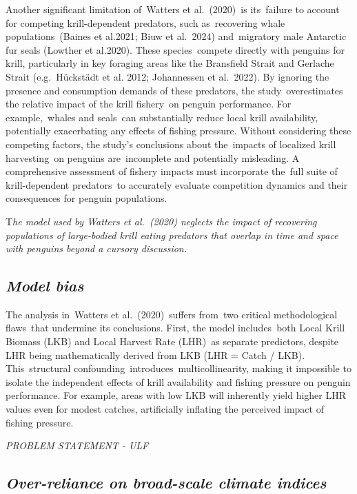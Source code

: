\documentclass[]{elsarticle} %
\begin{document}
Another significant limitation of~Watters et al.~(2020)~is its~failure
to account for competing krill-dependent predators, such as~recovering
whale populations~(Baines et al.2021; Biuw et al.~2024) and~migratory
male Antarctic fur seals (Lowther et al.2020). These species~compete
directly with penguins for krill, particularly in key foraging areas
like the Bransfield Strait and Gerlache Strait (e.g.~Hückstädt et al.
2012; Johannessen et al.~2022). By ignoring the presence and consumption
demands of these predators, the study~overestimates the relative impact
of the krill fishery~on penguin performance. For example,~whales and
seals~can substantially reduce local krill availability, potentially
exacerbating any effects of fishing pressure. Without considering these
competing factors, the study's conclusions about the~impacts of
localized krill harvesting~on penguins are~incomplete and potentially
misleading. A comprehensive assessment of fishery impacts must
incorporate the~full suite of krill-dependent predators~to accurately
evaluate competition dynamics and their consequences for penguin
populations.

T\emph{he model used by Watters et al.~(2020) neglects the impact of
recovering populations of large-bodied krill eating predators that
overlap in time and space with penguins beyond a cursory discussion.}

\subsection{\texorpdfstring{\emph{Model
bias}}{Model bias}}\label{model-bias}

The analysis in~Watters et al.~(2020)~suffers from~two critical
methodological flaws~that undermine its conclusions. First, the model
includes~both Local Krill Biomass (LKB) and Local Harvest Rate (LHR)~as
separate predictors, despite LHR being mathematically derived from LKB
(LHR = Catch / LKB). This~structural
confounding~introduces~multicollinearity, making it impossible to
isolate the independent effects of krill availability and fishing
pressure on penguin performance. For example, areas with low LKB will
inherently yield higher LHR values even for modest catches, artificially
inflating the perceived impact of fishing pressure.

\emph{PROBLEM STATEMENT - ULF}

\subsection{\texorpdfstring{\emph{Over-reliance on broad-scale climate
indices}}{Over-reliance on broad-scale climate indices}}\label{over-reliance-on-broad-scale-climate-indices}
\end{document}
